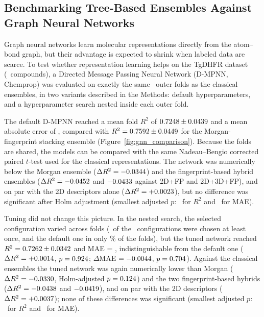\subsection{Benchmarking Tree-Based Ensembles Against Graph Neural Networks}
\label{sec:gnn_results}

Graph neural networks learn molecular representations directly from the atom--bond graph, but their advantage is expected to shrink when labeled data are scarce. To test whether representation learning helps on the TgDHFR dataset (\NCompounds\ compounds), a Directed Message Passing Neural Network (D-MPNN, Chemprop) was evaluated on exactly the same \TotalOuterFolds\ outer folds as the classical ensembles, in two variants described in the Methods: default hyperparameters, and a hyperparameter search nested inside each outer fold.

The default D-MPNN reached a mean fold $R^2$ of $0.7248 \pm 0.0439$ and a mean absolute error of \ChemPropDMPNNFoldMae, compared with $R^2 = 0.7592 \pm 0.0449$ for the Morgan-fingerprint stacking ensemble (Figure~\ref{fig:gnn_comparison}). Because the folds are shared, the models can be compared with the same Nadeau--Bengio corrected paired $t$-test used for the classical representations. The network was numerically below the Morgan ensemble ($\Delta R^2 = -0.0344$) and the fingerprint-based hybrid ensembles ($\Delta R^2 = -0.0452$ and $-0.0433$ against 2D+FP and 2D+3D+FP), and on par with the 2D descriptors alone ($\Delta R^2 = +0.0023$), but no difference was significant after Holm adjustment (smallest adjusted $p$: \GnnVsMinPRTwo\ for $R^2$ and \GnnVsMinPMae\ for MAE).

Tuning did not change this picture. In the nested search, the selected configuration varied across folds (\GnnTunedNChosen\ of the \GnnTunedNConfigs\ configurations were chosen at least once, and the default one in only \GnnTunedDefaultChosenPct\% of the folds), but the tuned network reached $R^2 = 0.7262 \pm 0.0342$ and MAE = \GnnTunedMae, indistinguishable from the default one ($\Delta R^2 = +0.0014$, $p = 0.924$; $\Delta$MAE $= -0.0044$, $p = 0.704$). Against the classical ensembles the tuned network was again numerically lower than Morgan ($\Delta R^2 = -0.0330$, Holm-adjusted $p = 0.124$) and the two fingerprint-based hybrids ($\Delta R^2 = -0.0438$ and $-0.0419$), and on par with the 2D descriptors ($\Delta R^2 = +0.0037$); none of these differences was significant (smallest adjusted $p$: \GnnTunedVsMinPRTwo\ for $R^2$ and \GnnTunedVsMinPMae\ for MAE).

